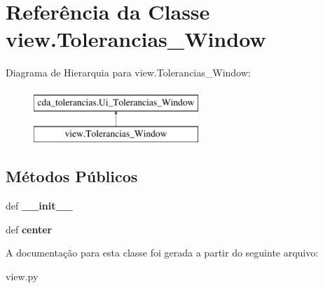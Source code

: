 \hypertarget{classview_1_1Tolerancias__Window}{\section{\-Referência da \-Classe view.\-Tolerancias\-\_\-\-Window}
\label{classview_1_1Tolerancias__Window}
}
\-Diagrama de \-Hierarquia para view.\-Tolerancias\-\_\-\-Window\-:\begin{figure}[H]
\begin{center}
\leavevmode
\includegraphics[height=2.000000cm]{classview_1_1Tolerancias__Window}
\end{center}
\end{figure}
\subsection*{\-Métodos \-Públicos}
\begin{DoxyCompactItemize}
\item 
\hypertarget{classview_1_1Tolerancias__Window_a52271491521d30db5b5d7fd2744a9f1a}{def {\bfseries \-\_\-\-\_\-init\-\_\-\-\_\-}}\label{classview_1_1Tolerancias__Window_a52271491521d30db5b5d7fd2744a9f1a}

\item 
\hypertarget{classview_1_1Tolerancias__Window_a6ad91eb38c78160ffcf32812c0e169ff}{def {\bfseries center}}\label{classview_1_1Tolerancias__Window_a6ad91eb38c78160ffcf32812c0e169ff}

\end{DoxyCompactItemize}


\-A documentação para esta classe foi gerada a partir do seguinte arquivo\-:\begin{DoxyCompactItemize}
\item 
view.\-py\end{DoxyCompactItemize}
